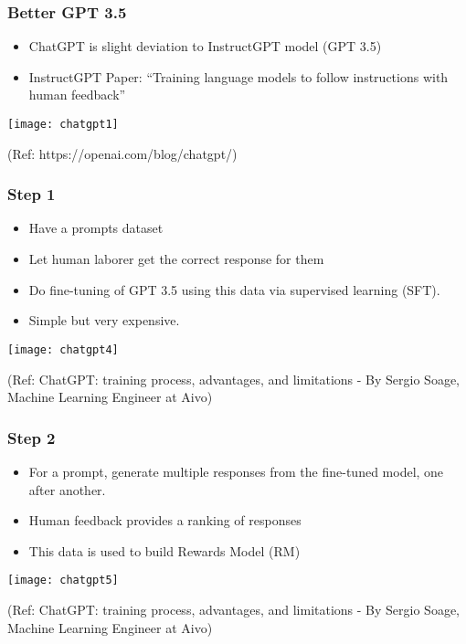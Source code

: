 \begin{frame}[fragile]\frametitle{Better GPT 3.5}

\begin{itemize}
\item ChatGPT is slight deviation to InstructGPT model (GPT 3.5)
\item InstructGPT Paper: ``Training language models to follow instructions with human feedback''
\end{itemize}	 

\begin{center}
\texttt{[image: chatgpt1]}
\end{center}		

\tiny{(Ref: https://openai.com/blog/chatgpt/)}
\end{frame}

\begin{frame}[fragile]\frametitle{Step 1}

\begin{itemize}
\item Have a prompts dataset 
\item Let human laborer get the correct response for them
\item Do fine-tuning of GPT 3.5 using this data via supervised learning (SFT). 
\item Simple but very expensive.
\end{itemize}	 

			\begin{center}
			\texttt{[image: chatgpt4]}
			
			\end{center}		
			
			{\tiny (Ref: ChatGPT: training process, advantages, and limitations - By Sergio Soage, Machine Learning Engineer at Aivo)}
			
\end{frame}

\begin{frame}[fragile]\frametitle{Step 2}

\begin{itemize}
\item For a prompt, generate multiple responses from the fine-tuned model, one after another.
\item Human feedback provides a ranking of responses
\item This data is used to build Rewards Model (RM)
\end{itemize}	 

			\begin{center}
			\texttt{[image: chatgpt5]}
			
			\end{center}		
			
			{\tiny (Ref: ChatGPT: training process, advantages, and limitations - By Sergio Soage, Machine Learning Engineer at Aivo)}
			
\end{frame}


